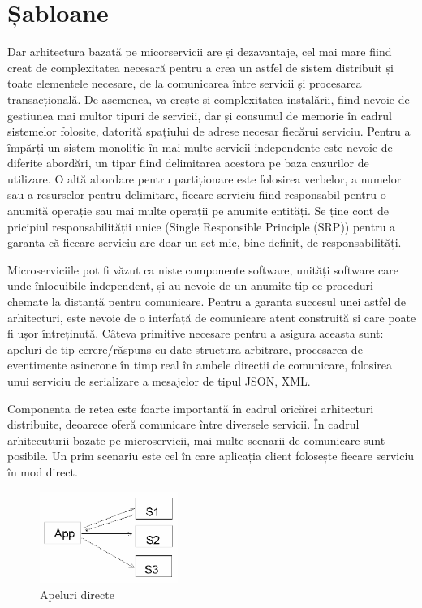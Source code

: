 \documentclass[12pt, a4paper, twocolumn]{article} %
\begin{document}
\clearpage

\section{Șabloane} Dar arhitectura bazată pe micorservicii are și dezavantaje, cel mai mare fiind creat de complexitatea necesară pentru a crea un astfel de sistem distribuit și toate elementele necesare, de la comunicarea între servicii și procesarea transacțională. De asemenea, va crește și complexitatea instalării, fiind nevoie de gestiunea mai multor tipuri de servicii, dar și consumul de memorie în cadrul sistemelor folosite, datorită spațiului de adrese necesar fiecărui serviciu. Pentru a împărți un sistem monolitic în mai multe servicii independente este nevoie de diferite abordări, un tipar fiind delimitarea acestora pe baza cazurilor de utilizare. O altă abordare pentru partiționare este folosirea verbelor, a numelor sau a resurselor pentru delimitare, fiecare serviciu fiind responsabil pentru o anumită operație sau mai multe operații pe anumite entități.\citep{hassan2010provisioning} Se ține cont de pricipiul responsabilității unice (Single Responsible Principle (SRP)) pentru a garanta că fiecare serviciu are doar un set mic, bine definit, de responsabilități.\par
Microserviciile pot fi văzut ca niște componente software, unități software care unde înlocuibile independent, și au nevoie de un anumite tip ce proceduri chemate la distanță pentru comunicare. Pentru a garanta succesul unei astfel de arhitecturi, este nevoie de o interfață de comunicare atent construită și care poate fi ușor întreținută. Câteva primitive necesare pentru a asigura aceasta sunt: apeluri de tip cerere/răspuns cu date structura arbitrare, procesarea de eventimente asincrone în timp real în ambele direcții de comunicare, folosirea unui serviciu de serializare a mesajelor de tipul JSON, XML.\par
Componenta de rețea este foarte importantă în cadrul oricărei arhitecturi distribuite, deoarece oferă comunicare între diversele servicii. În cadrul arhitecuturii bazate pe microservicii, mai multe scenarii de comunicare sunt posibile. Un prim scenariu este cel în care aplicația client folosește fiecare serviciu în mod direct.

\begin{figure}[h]
\caption{Apeluri directe}
\centering
\includegraphics[width=0.4\textwidth]{direct}
\end{figure}
\end{document}
